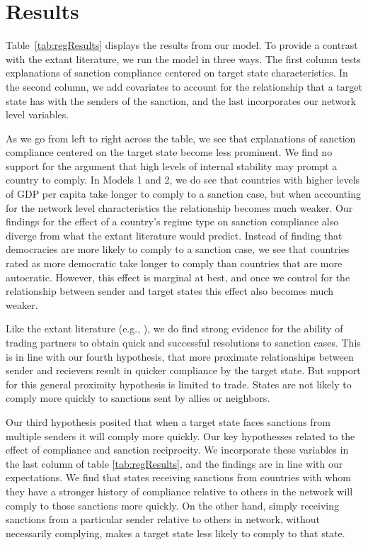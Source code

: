 \section*{Results}
\label{Results} 

Table~\ref{tab:regResults} displays the results from our model. To provide a contrast with the extant literature, we run the model in three ways. The first column tests explanations of sanction compliance centered on target state characteristics. In the second column, we add covariates to account for the relationship that a target state has with the senders of the sanction, and the last incorporates our network level variables. 

As we go from left to right across the table, we see that explanations of sanction compliance centered on the target state become less prominent. We find no support for the argument that high levels of internal stability may prompt a country to comply. In Models 1 and 2, we do see that countries with higher levels of GDP per capita take longer to comply to a sanction case, but when accounting for the network level characteristics the relationship becomes much weaker. Our findings for the effect of a country's regime type on sanction compliance also diverge from what the extant literature would predict. Instead of finding that democracies are more likely to comply to a sanction case, we see that countries rated as more democratic take longer to comply than countries that are more autocratic. However, this effect is marginal at best, and once we control for the relationship between sender and target states this effect also becomes much weaker. 

Like the extant literature (e.g., \citealp{mclean2010friends}), we do find strong evidence for the ability of trading partners to obtain quick and successful resolutions to sanction cases. This is in line with our fourth hypothesis, that more proximate relationships between sender and recievers result in quicker compliance by the target state. But support for this general proximity hypothesis is limited to trade. States are not likely to comply more quickly to sanctions sent by allies or neighbors. 


\FloatBarrier

Our third hypothesis posited that when a target state faces sanctions from multiple senders it will comply more quickly. Our key hypothesses related to the effect of compliance and sanction reciprocity. We incorporate these variables in the last column of table \ref{tab:regResults}, and the findings are in line with our expectations. We find that states receiving sanctions from countries with whom they have a stronger history of compliance relative to others in the network will comply to those sanctions more quickly. On the other hand, simply receiving sanctions from a particular sender relative to others in network, without necessarily complying, makes a target state less likely to comply to that state. 


